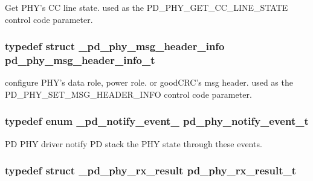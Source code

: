 Get P\-H\-Y's C\-C line state. used as the P\-D\-\_\-\-P\-H\-Y\-\_\-\-G\-E\-T\-\_\-\-C\-C\-\_\-\-L\-I\-N\-E\-\_\-\-S\-T\-A\-T\-E control code parameter. 

\hypertarget{group__usb__pd__phy__drv_gae09b52ec05cde39c9fdc66f179a65d61}{
\subsubsection[{pd\-\_\-phy\-\_\-msg\-\_\-header\-\_\-info\-\_\-t}]{\setlength{\rightskip}{0pt plus 5cm}typedef struct {\bf \-\_\-pd\-\_\-phy\-\_\-msg\-\_\-header\-\_\-info}  {\bf pd\-\_\-phy\-\_\-msg\-\_\-header\-\_\-info\-\_\-t}}}\label{group__usb__pd__phy__drv_gae09b52ec05cde39c9fdc66f179a65d61}


configure P\-H\-Y's data role, power role. or good\-C\-R\-C's msg header. used as the P\-D\-\_\-\-P\-H\-Y\-\_\-\-S\-E\-T\-\_\-\-M\-S\-G\-\_\-\-H\-E\-A\-D\-E\-R\-\_\-\-I\-N\-F\-O control code parameter. 

\hypertarget{group__usb__pd__phy__drv_ga08a2ea1727987dec255c30cdea6396fa}{
\subsubsection[{pd\-\_\-phy\-\_\-notify\-\_\-event\-\_\-t}]{\setlength{\rightskip}{0pt plus 5cm}typedef enum {\bf \-\_\-pd\-\_\-notify\-\_\-event\-\_\-}  {\bf pd\-\_\-phy\-\_\-notify\-\_\-event\-\_\-t}}}\label{group__usb__pd__phy__drv_ga08a2ea1727987dec255c30cdea6396fa}


P\-D P\-H\-Y driver notify P\-D stack the P\-H\-Y state through these events. 

\hypertarget{group__usb__pd__phy__drv_gab6924dca8731119eec80f1740a1564eb}{
\subsubsection[{pd\-\_\-phy\-\_\-rx\-\_\-result\-\_\-t}]{\setlength{\rightskip}{0pt plus 5cm}typedef struct {\bf \-\_\-pd\-\_\-phy\-\_\-rx\-\_\-result}  {\bf pd\-\_\-phy\-\_\-rx\-\_\-result\-\_\-t}}}\label{group__usb__pd__phy__drv_gab6924dca8731119eec80f1740a1564eb}


